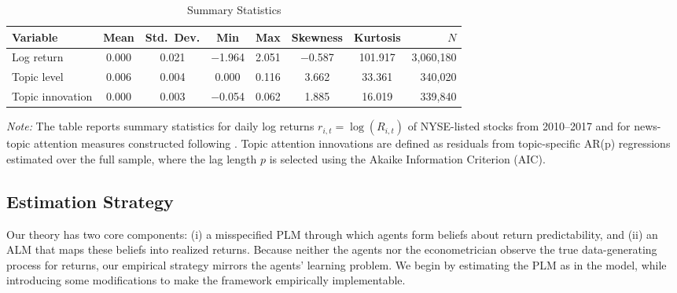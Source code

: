 \documentclass[11pt]{article}
\begin{document}
\begin{table}[H]
\centering
\caption{Summary Statistics}
\label{tab:summary_stats}

\begin{tabularx}{\textwidth}{@{}>{\small}Xccccccr@{}}
\toprule
Variable & Mean & Std.\ Dev. & Min & Max & Skewness & Kurtosis & $N$ \\
\midrule
Log return 
& 0.000 & 0.021 & $-$1.964 & 2.051 & $-$0.587 & 101.917 & 3{,}060{,}180 \\
\midrule
Topic level 
& 0.006 & 0.004 & 0.000 & 0.116 & 3.662 & 33.361 & 340{,}020 \\
Topic innovation 
& 0.000 & 0.003 & $-$0.054 & 0.062 & 1.885 & 16.019 & 339{,}840 \\
\bottomrule
\end{tabularx}

\medskip
\begin{minipage}{\textwidth}
\footnotesize
\textit{Note:} The table reports summary statistics for daily log returns
$r_{i,t}=\log(R_{i,t})$ of NYSE-listed stocks from 2010--2017 and for news-topic
attention measures constructed following \citet{Bybee2021}.
Topic attention innovations are defined as residuals from topic-specific AR(p)
regressions estimated over the full sample, where the lag length $p$ is selected using the Akaike Information Criterion (AIC).
\end{minipage}
\end{table}


\subsection{Estimation Strategy}

Our theory has two core components: (i) a misspecified PLM through which agents form beliefs about return predictability, and (ii) an ALM that maps these beliefs into realized returns. 
Because neither the agents nor the econometrician observe the true data-generating process for returns, our empirical strategy mirrors the agents’ learning problem.
We begin by estimating the PLM as in the model, while introducing some modifications to make the framework empirically implementable.
\end{document}
